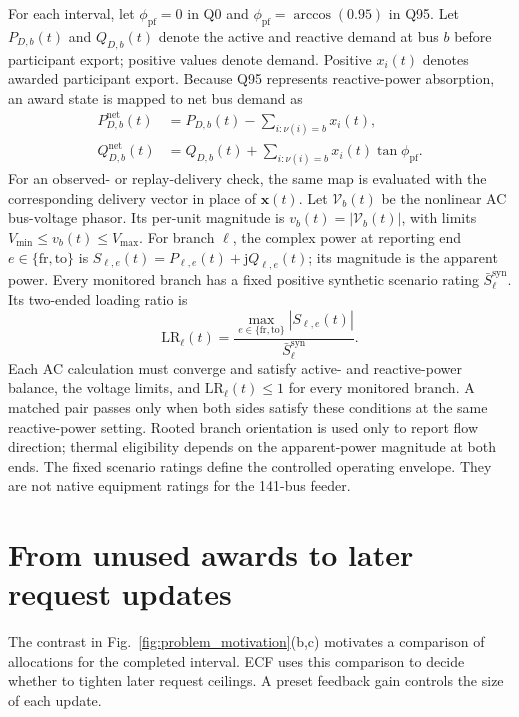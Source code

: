 \documentclass[twoside,twocolumn,9pt]{article}
\begin{document}
{For each interval, let $\phi_{\mathrm{pf}}=0$ in Q0 and
$\phi_{\mathrm{pf}}=\arccos(0.95)$ in Q95. Let $P_{D,b}(t)$ and $Q_{D,b}(t)$
denote the active and reactive demand at bus $b$ before participant export;
positive values denote demand. Positive $x_i(t)$ denotes awarded participant
export. Because Q95 represents reactive-power absorption, an award state is
mapped to net bus demand as
\begin{align}
P_{D,b}^{\mathrm{net}}(t)
&=P_{D,b}(t)-\sum_{i:\nu(i)=b}x_i(t),\nonumber\\
Q_{D,b}^{\mathrm{net}}(t)
&=Q_{D,b}(t)+\sum_{i:\nu(i)=b}x_i(t)\tan\phi_{\mathrm{pf}}.
\label{eq:participant_bus_injection_map}
\end{align}
For an observed- or replay-delivery check, the same map is evaluated with the
corresponding delivery vector in place of $\mathbf x(t)$.
Let $\mathcal V_b(t)$ be the nonlinear AC bus-voltage phasor. Its per-unit
magnitude is $v_b(t)=|\mathcal V_b(t)|$, with limits
$V_{\min}\le v_b(t)\le V_{\max}$. For branch $\ell$, the complex power at
reporting end $e\in\{\mathrm{fr},\mathrm{to}\}$ is
$S_{\ell,e}(t)=P_{\ell,e}(t)+\mathrm{j}Q_{\ell,e}(t)$; its magnitude is the
apparent power. Every monitored branch has a fixed positive
synthetic scenario rating $\bar S_{\ell}^{\mathrm{syn}}$. Its two-ended loading ratio is
\begin{equation}
\mathrm{LR}_\ell(t)=
\frac{\max_{e\in\{\mathrm{fr},\mathrm{to}\}}|S_{\ell,e}(t)|}
{\bar S_{\ell}^{\mathrm{syn}}}.
\label{eq:two_ended_loading_ratio}
\end{equation}
Each AC calculation must converge and satisfy active- and reactive-power
balance, the voltage limits, and $\mathrm{LR}_\ell(t)\le1$ for every monitored
branch. A matched pair passes only when both sides satisfy these conditions at
the same reactive-power setting. Rooted branch orientation is used only to
report flow direction; thermal eligibility depends on the apparent-power
magnitude at both ends. The fixed scenario ratings define the controlled
operating envelope. They are not native equipment ratings for the 141-bus
feeder.
}

\section{From unused awards to later request updates}
\label{sec:concept}

The contrast in Fig.~\ref{fig:problem_motivation}(b,c) motivates a comparison
of allocations for the completed interval. ECF uses this comparison to decide
whether to tighten later request ceilings. A preset feedback gain controls the
size of each update.
\end{document}
